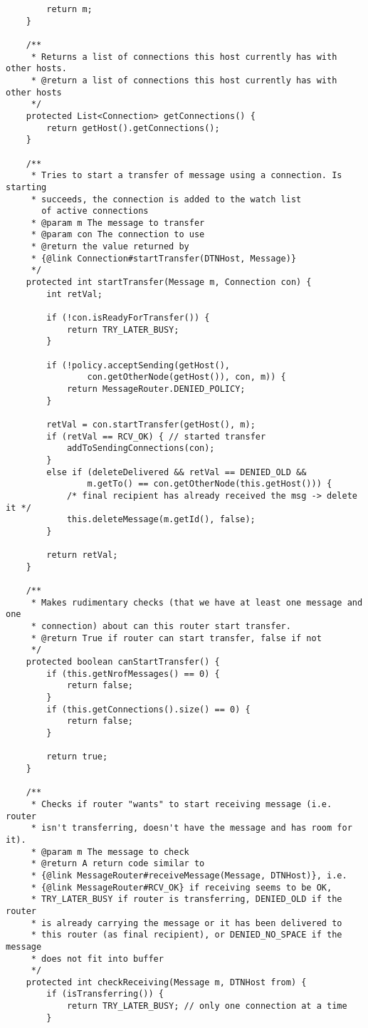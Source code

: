 \documentclass[11pt]{icsthesis}
\begin{document}
\begin{framed}
\begin{verbatim}
		return m;
	}
	
	/**
	 * Returns a list of connections this host currently has with other hosts.
	 * @return a list of connections this host currently has with other hosts
	 */
	protected List<Connection> getConnections() {
		return getHost().getConnections();
	}
	
	/**
	 * Tries to start a transfer of message using a connection. Is starting
	 * succeeds, the connection is added to the watch list 
       of active connections
	 * @param m The message to transfer
	 * @param con The connection to use
	 * @return the value returned by 
	 * {@link Connection#startTransfer(DTNHost, Message)}
	 */
	protected int startTransfer(Message m, Connection con) {
		int retVal;
		
		if (!con.isReadyForTransfer()) {
			return TRY_LATER_BUSY;
		}
		
		if (!policy.acceptSending(getHost(), 
				con.getOtherNode(getHost()), con, m)) {
			return MessageRouter.DENIED_POLICY;
		}
		
		retVal = con.startTransfer(getHost(), m);
		if (retVal == RCV_OK) { // started transfer
			addToSendingConnections(con);
		}
		else if (deleteDelivered && retVal == DENIED_OLD && 
				m.getTo() == con.getOtherNode(this.getHost())) {
			/* final recipient has already received the msg -> delete it */
			this.deleteMessage(m.getId(), false);
		}
		
		return retVal;
	}
	
	/**
	 * Makes rudimentary checks (that we have at least one message and one
	 * connection) about can this router start transfer.
	 * @return True if router can start transfer, false if not
	 */
	protected boolean canStartTransfer() {
		if (this.getNrofMessages() == 0) {
			return false;
		}
		if (this.getConnections().size() == 0) {
			return false;
		}
		
		return true;
	}
	
	/**
	 * Checks if router "wants" to start receiving message (i.e. router 
	 * isn't transferring, doesn't have the message and has room for it).
	 * @param m The message to check
	 * @return A return code similar to 
	 * {@link MessageRouter#receiveMessage(Message, DTNHost)}, i.e. 
	 * {@link MessageRouter#RCV_OK} if receiving seems to be OK, 
	 * TRY_LATER_BUSY if router is transferring, DENIED_OLD if the router
	 * is already carrying the message or it has been delivered to
	 * this router (as final recipient), or DENIED_NO_SPACE if the message
	 * does not fit into buffer
	 */
	protected int checkReceiving(Message m, DTNHost from) {
		if (isTransferring()) {
			return TRY_LATER_BUSY; // only one connection at a time
		}
	

\end{verbatim}
\end{framed}
\end{document}
